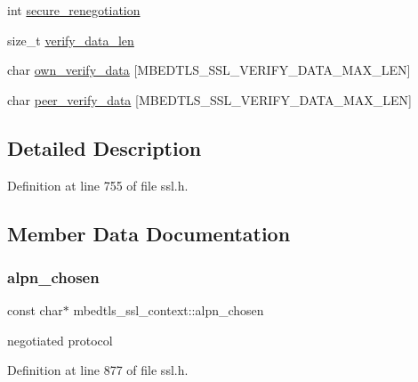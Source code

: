 \begin{DoxyCompactItemize}
\item 
int \mbox{\hyperlink{structmbedtls__ssl__context_ad7865b811cb03e5f4327102d555769d1}{secure\+\_\+renegotiation}}
\item 
size\+\_\+t \mbox{\hyperlink{structmbedtls__ssl__context_a06b667bf3672f8d480f962970c5adc7d}{verify\+\_\+data\+\_\+len}}
\item 
char \mbox{\hyperlink{structmbedtls__ssl__context_a55b04578ece6b1621c8f1629481506f1}{own\+\_\+verify\+\_\+data}} \mbox{[}M\+B\+E\+D\+T\+L\+S\+\_\+\+S\+S\+L\+\_\+\+V\+E\+R\+I\+F\+Y\+\_\+\+D\+A\+T\+A\+\_\+\+M\+A\+X\+\_\+\+L\+EN\mbox{]}
\item 
char \mbox{\hyperlink{structmbedtls__ssl__context_a75c8c793f5cff7b0892f0616a40cede7}{peer\+\_\+verify\+\_\+data}} \mbox{[}M\+B\+E\+D\+T\+L\+S\+\_\+\+S\+S\+L\+\_\+\+V\+E\+R\+I\+F\+Y\+\_\+\+D\+A\+T\+A\+\_\+\+M\+A\+X\+\_\+\+L\+EN\mbox{]}
\end{DoxyCompactItemize}


\subsection{Detailed Description}


Definition at line 755 of file ssl.\+h.



\subsection{Member Data Documentation}
\mbox{\label{structmbedtls__ssl__context_a858fd8077042db3804cd2e4aef9e2f20}} 
\subsubsection{\texorpdfstring{alpn\+\_\+chosen}{alpn\_chosen}}
{\footnotesize\ttfamily const char$\ast$ mbedtls\+\_\+ssl\+\_\+context\+::alpn\+\_\+chosen}

negotiated protocol 

Definition at line 877 of file ssl.\+h.

\mbox{\label{structmbedtls__ssl__context_ade2a10fc444a50b44a2caee1312d5b7e}} 
